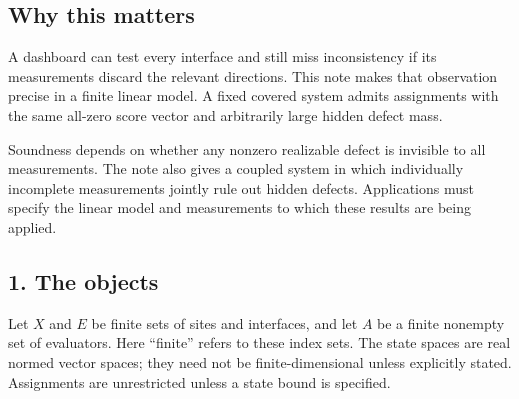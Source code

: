 \documentclass[
  11pt,
]{article}
\theoremstyle{plain}
\theoremstyle{definition}\newtheorem{definition}[theorem]{Definition}
\theoremstyle{remark}\newtheorem*{remark}{Remark}
\begin{document}
\subsection{Why this matters}\label{why-this-matters}

A dashboard can test every interface and still miss inconsistency if its
measurements discard the relevant directions. This note makes that
observation precise in a finite linear model. A fixed covered system
admits assignments with the same all-zero score vector and arbitrarily
large hidden defect mass.

Soundness depends on whether any nonzero realizable defect is invisible
to all measurements. The note also gives a coupled system in which
individually incomplete measurements jointly rule out hidden defects.
Applications must specify the linear model and measurements to which
these results are being applied.

\subsection{1. The objects}\label{the-objects}

Let \(X\) and \(E\) be finite sets of sites and interfaces, and let
\(A\) be a finite nonempty set of evaluators. Here ``finite'' refers to
these index sets. The state spaces are real normed vector spaces; they
need not be finite-dimensional unless explicitly stated. Assignments are
unrestricted unless a state bound is specified.
\end{document}
